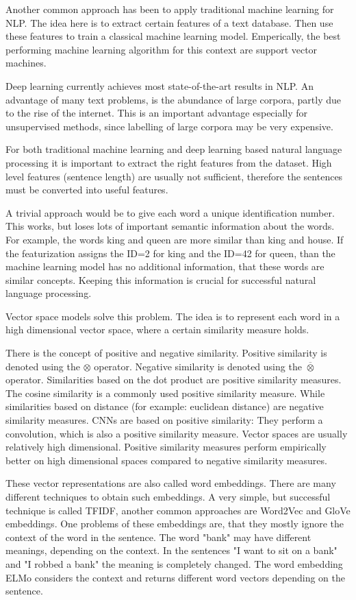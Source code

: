 \documentclass[draft,final,oneside]{vutinfth} %
\begin{document}
Another common approach has been to apply traditional machine learning for NLP. The idea here is to extract certain features of a  text database. Then use these features to train a classical machine learning model. Emperically, the best performing machine learning algorithm for this context are support vector machines.

Deep learning currently achieves most state-of-the-art results in NLP. An advantage of many text problems, is the abundance of large corpora, partly due to the rise of the internet. This is an important advantage especially for unsupervised methods, since labelling of large corpora may be very expensive.

For both traditional machine learning and deep learning based natural language processing it is important to extract the right features from the dataset. High level features (sentence length) are usually not sufficient, therefore the sentences must be converted into useful features.

A trivial approach would be to give each word a unique identification number. This works, but loses lots of important semantic information about the words. For example, the words king and queen are more similar than king and house. If the featurization assigns the ID=2 for king and the ID=42 for queen, than the machine learning model has no additional information, that these words are similar concepts. Keeping this information is crucial for successful natural language processing.

Vector space models solve this problem. The idea is to represent each word in a high dimensional vector space, where a certain similarity measure holds.

There is the concept of positive and negative similarity. Positive similarity is denoted using the $\otimes$ operator. Negative similarity is denoted using the $\overline{\otimes}$ operator. \cite{TUW-233295} Similarities based on the dot product are positive similarity measures. The cosine similarity is a commonly used positive similarity measure. While similarities based on distance (for example: euclidean distance) are negative similarity measures. CNNs are based on positive similarity: They perform a convolution, which is also a positive similarity measure. Vector spaces are usually relatively high dimensional. Positive similarity measures perform empirically better on high dimensional spaces compared to negative similarity measures.	

These vector representations are also called word embeddings. There are many different techniques to obtain such embeddings. A very simple, but successful technique is called TFIDF, another common approaches are Word2Vec and GloVe embeddings. One problems of these embeddings are, that they mostly ignore the context of the word in the sentence. The word "bank" may have different meanings, depending on the context. In the sentences "I want to sit on a bank" and "I robbed a bank" the meaning is completely changed. The word embedding ELMo considers the context and returns different word vectors depending on the sentence.
\end{document}
